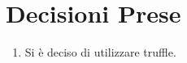 \section{Decisioni Prese}
\begin{enumerate}
  \item Si è deciso di utilizzare truffle.
\end{enumerate}
